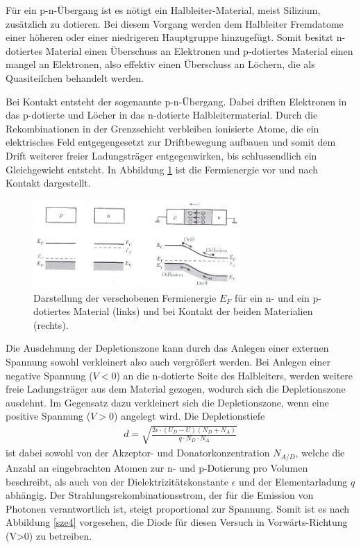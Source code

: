 Für ein p-n-Übergang ist es nötigt ein Halbleiter-Material, meist Silizium, zusätzlich zu dotieren. Bei diesem Vorgang werden dem Halbleiter Fremdatome einer höheren oder einer niedrigeren Hauptgruppe hinzugefügt. Somit besitzt n-dotiertes Material einen Überschuss an Elektronen und p-dotiertes Material einen mangel an Elektronen, also effektiv einen Überschuss an Löchern, die als Quasiteilchen behandelt werden. 

Bei Kontakt entsteht der sogenannte p-n-Übergang. Dabei driften Elektronen in das p-dotierte und Löcher in das n-dotierte Halbleitermaterial. Durch die Rekombinationen in der Grenzschicht verbleiben ionisierte Atome, die ein elektrisches Feld entgegengesetzt zur Driftbewegung aufbauen und somit dem Drift weiterer freier Ladungsträger entgegenwirken, bis schlussendlich ein Gleichgewicht entsteht. In Abbildung \ref{sze3} ist die Fermienergie vor und nach Kontakt dargestellt.

\begin{figure}[H]
\centering
\includegraphics[width=0.7\textwidth]{ressources/junction.png}
\caption{Darstellung der verschobenen Fermienergie $E_F$ für ein n- und ein p-dotiertes Material (links) und bei Kontakt der beiden Materialien (rechts). \cite{SZE}}
\label{sze3}
\end{figure}

Die Ausdehnung der Depletionszone kann durch das Anlegen einer externen Spannung sowohl verkleinert also auch vergrößert werden. Bei Anlegen einer negative Spannung ($V<0$) an die n-dotierte Seite des Halbleiters, werden weitere freie Ladungsträger aus dem Material gezogen, wodurch sich die Depletionszone ausdehnt. Im Gegensatz dazu verkleinert sich die Depletionszone, wenn eine positive Spannung ($V>0$) angelegt wird. Die Depletionstiefe
\begin{align}
	d=\sqrt{\frac{2\epsilon\cdot(U_D-U)(N_D+N_A)}{q\cdot N_D\cdot N_A}}
\end{align} 
ist dabei sowohl von der Akzeptor- und Donatorkonzentration $N_{A/D}$, welche die Anzahl an eingebrachten Atomen zur n- und p-Dotierung pro Volumen beschreibt, als auch von der Dielektrizitätskonstante $\epsilon$ und der Elementarladung $q$ abhängig. Der Strahlungsrekombinationsstrom, der für die Emission von Photonen verantwortlich ist, steigt proportional zur Spannung. Somit ist es nach Abbildung \ref{sze4} vorgesehen, die Diode für diesen Versuch in Vorwärts-Richtung (V>0) zu betreiben.


